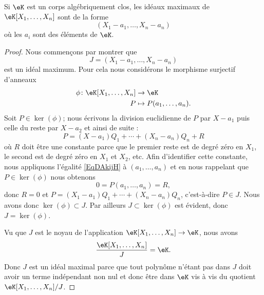 \begin{theorem}  \label{ThowgZYqx}
    Si \( \eK\) est un corps algébriquement clos, les idéaux maximaux de \( \eK[X_1,\ldots, X_n]\) sont de la forme
    \begin{equation}
        (X_1-a_1,\ldots, X_n-a_n)
    \end{equation}
    où les \( a_i\) sont des éléments de \( \eK\).
\end{theorem}

\begin{proof}
    Nous commençons par montrer que
    \begin{equation}
        J=(X_1-a_1,\ldots, X_n-a_n)
    \end{equation}
    est un idéal maximum. Pour cela nous considérons le morphisme surjectif d'anneaux
    \begin{equation}
        \begin{aligned}
            \phi\colon \eK[X_1,\ldots, X_n]&\to \eK \\
            P&\mapsto P(a_1,\ldots, a_n).
        \end{aligned}
    \end{equation}
    Soit \( P\in\ker(\phi)\); nous écrivons la division euclidienne de \( P\) par \( X-a_1\) puis celle du reste par \( X-a_2\) et ainsi de suite :
    \begin{equation}    \label{EqDAkijH}
        P=(X-a_1)Q_1+\cdots +(X_n-a_n)Q_n+R
    \end{equation}
    où \( R\) doit être une constante parce que le premier reste est de degré zéro en \( X_1\), le second est de degré zéro en \( X_1\) et \( X_2\), etc. Afin d'identifier cette constante, nous appliquons l'égalité \eqref{EqDAkijH} à \( (a_1,\ldots, a_n)\) et en nous rappelant que \( P\in \ker(\phi)\) nous obtenons
    \begin{equation}
        0=P(a_1,\ldots, a_n)=R,
    \end{equation}
    donc \( R=0\) et \( P=(X_1-a_1)Q_1+\cdots +(X_n-a_n)Q_n\), c'est-à-dire \( P\in J\). Nous avons donc \( \ker(\phi)\subset J\). Par ailleurs \( J\subset \ker(\phi)\) est évident, donc \( J=\ker(\phi)\).

    Vu que \( J\) est le noyau de l'application \( \eK[X_1,\ldots, X_n]\to \eK\), nous avons
    \begin{equation}
        \frac{ \eK[X_1,\ldots, X_n] }{ J }=\eK.
    \end{equation}
    Donc \( J\) est un idéal maximal parce que tout polynôme n'étant pas dans \( J\) doit avoir un terme indépendant non nul et donc être dans \( \eK\) vis à vis du quotient \( \eK[X_1,\ldots, X_n]/J\).


\end{proof}
